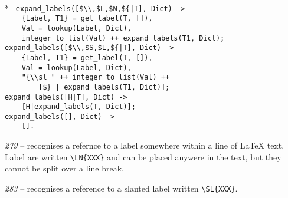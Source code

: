 \begin{flushleft}
\label{eweave_5_14}
\\*
\tt
\noindent{}%
\verb&expand_labels([$\\,$L,$N,${|T], Dict) ->&\\
\noindent{}%
\verb&    {Label, T1} = get_label(T, []),&\\
\noindent{}%
\verb&    Val = lookup(Label, Dict),&\\
\noindent{}%
\verb&    integer_to_list(Val) ++ expand_labels(T1, Dict);&\\
\noindent{}%
\verb&expand_labels([$\\,$S,$L,${|T], Dict) ->&\\
\noindent{}%
\verb&    {Label, T1} = get_label(T, []),&\\
\noindent{}%
\verb&    Val = lookup(Label, Dict),&\\
\noindent{}%
\verb&    "{\\sl " ++ integer_to_list(Val) ++&\\
\noindent{}%
\verb&        [$} | expand_labels(T1, Dict)];&\\
\noindent{}%
\verb&expand_labels([H|T], Dict) ->&\\
\noindent{}%
\verb&    [H|expand_labels(T, Dict)];&\\
\noindent{}%
\verb&expand_labels([], Dict) ->&\\
\noindent{}%
\verb&    [].&\\
\end{flushleft}

{\sl 279} -- recognises a refernce to a label somewhere within a
line of \LaTeX{} text. Label are written \verb+\L+\verb+N{XXX}+ and can
be placed anywere in the text, but they cannot be split over a line
break.

{\sl 283} -- recognises a reference to a slanted label
written \verb+\S+\verb+L{XXX}+.

